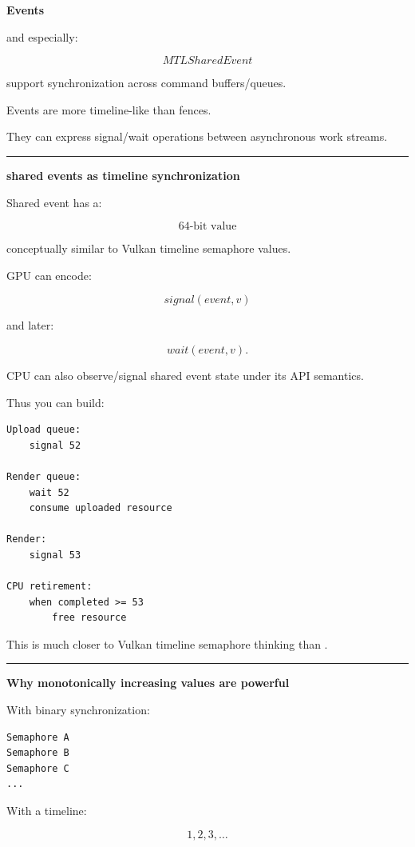 \textbf{Events}

 and especially:

\[
MTLSharedEvent
\]

support synchronization across command buffers/queues.

Events are more timeline-like than fences.

They can express signal/wait operations between asynchronous work streams.

\begin{center}\rule{0.5\linewidth}{0.5pt}\end{center}

\textbf{shared events as timeline synchronization}

Shared event has a:

\[
64\text{-bit value}
\]

conceptually similar to Vulkan timeline semaphore values.

GPU can encode:

\[
signal(event,v)
\]

and later:

\[
wait(event,v).
\]

CPU can also observe/signal shared event state under its API semantics.

Thus you can build:

\begin{verbatim}
Upload queue:
    signal 52

Render queue:
    wait 52
    consume uploaded resource

Render:
    signal 53

CPU retirement:
    when completed >= 53
        free resource
\end{verbatim}

This is much closer to Vulkan timeline semaphore thinking than .

\begin{center}\rule{0.5\linewidth}{0.5pt}\end{center}

\textbf{Why monotonically increasing values are powerful}

With binary synchronization:

\begin{verbatim}
Semaphore A
Semaphore B
Semaphore C
...
\end{verbatim}

With a timeline:

\[
1,2,3,\dots
\]

